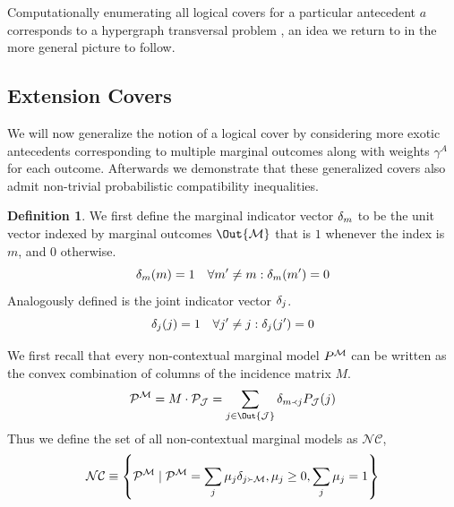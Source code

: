 \documentclass[aps, 10pt, english, twoside, pra, nofootinbib, longbibliography]{revtex4-1}
\theoremstyle{plain}
\theoremstyle{definition}
\newtheorem{definition}[theorem]{Definition}
\theoremstyle{remark}
\newcommand{\ext}{\mathrel{\Yleft}}
\newcommand{\res}{\mathrel{\Yright}}
\newcommand{\mscenario}{\mathcal{M}}
\newcommand{\jointvar}{\mathcal{J}}
\newcommand{\mset}[1]{\gamma^{#1}}
\begin{document}
    Computationally enumerating all logical covers for a particular antecedent $a$ corresponds to a hypergraph transversal problem \cite{Inflation}, an idea we return to in the more general picture to follow.

    \subsection{Extension Covers}
    We will now generalize the notion of a logical cover by considering more exotic antecedents corresponding to multiple marginal outcomes along with weights $\mset{A}$ for each outcome. Afterwards we demonstrate that these generalized covers also admit non-trivial probabilistic compatibility inequalities.

    \begin{definition}
        We first define the marginal indicator vector $\delta_{m}$ to be the unit vector indexed by marginal outcomes $\Out{\mscenario}$ that is $1$ whenever the index is $m$, and $0$ otherwise.
        \[ \de_{m}\br{m} = 1 \quad \forall m' \neq m : \de_{m} \br{m'} = 0 \]
        Analogously defined is the joint indicator vector $\delta_{j}$.
        \[ \de_{j}\br{j} = 1 \quad \forall j' \neq j : \de_{j} \br{j'} = 0 \]
    \end{definition}

    We first recall that every non-contextual marginal model $\prob^{\mscenario}$ can be written as the convex combination of columns of the incidence matrix $M$.
    \[ \probvec^{\mscenario} = M \cdot \probvec[\jointvar] = \sum_{j \in \Out{\jointvar}} \de_{m \ext j} \prob[\jointvar][j] \]
    Thus we define the set of all non-contextual marginal models as $\mathcal{NC}$,
    \[ \mathcal{NC} \defined \bc{\probvec^{\mscenario} \mid \probvec^{\mscenario} = \sum_{j} \mu_{j} \de_{j \res \mscenario}, \mu_j \geq 0, \sum_{j} \mu_{j} = 1} \]
\end{document}
